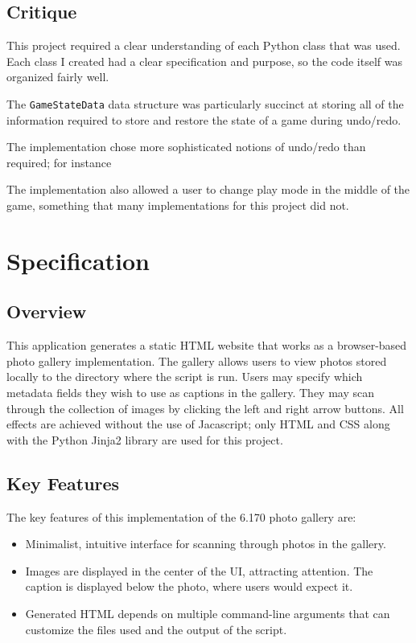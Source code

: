 \documentclass[11pt,letterpaper]{article}
\begin{document}
\subsection{Critique}
This project required a clear understanding of each Python class that was used. Each class I created had a clear specification and purpose, so the code itself was organized fairly well.

The \texttt{GameStateData} data structure was particularly succinct at storing all of the information required to store and restore the state of a game during undo/redo.

The implementation chose more sophisticated notions of undo/redo than required; for instance

The implementation also allowed a user to change play mode in the middle of the game, something that many implementations for this project did not.
\section{Specification}
\subsection{Overview}
This application generates a static HTML website that works as a browser-based photo gallery implementation. The gallery allows users to view photos stored locally to the directory where the script is run. Users may specify which metadata fields they wish to use as captions in the gallery. They may scan through the collection of images by clicking the left and right arrow buttons. All effects are achieved without the use of Jacascript; only HTML and CSS along with the Python Jinja2 library are used for this project.
\subsection{Key Features}
The key features of this implementation of the 6.170 photo gallery are:
\begin{itemize}
\item Minimalist, intuitive interface for scanning through photos in the gallery.
\item Images are displayed in the center of the UI, attracting attention. The caption is displayed below the photo, where users would expect it.
\item Generated HTML depends on multiple command-line arguments that can customize the files used and the output of the script.
\end{itemize}
\end{document}
